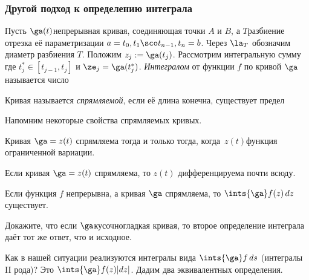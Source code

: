 \documentclass[a4paper]{article}
\begin{document}
\subsubsection{Другой подход к определению интеграла}

\begin{df}
Пусть $\ga(t)$\т непрерывная кривая, соединяющая точки $A$ и $B$, а $T$\т разбиение отрезка её
параметризации $a=t_0, t_1 \sco t_{n-1}, t_n=b$. Через $\la_T$ обозначим диаметр разбиения $T$.
Положим $z_j := \ga(t_j)$. Рассмотрим интегральную сумму
где $t^*_j\in [t_{j-1}, t_j]$ и $\ze_j = \ga(t^*_j)$. \emph{Интегралом} от функции $f$ по кривой $\ga$ называется число
\end{df}

\begin{df}
Кривая называется \emph{спрямляемой}, если её длина конечна,  существует предел
\end{df}

Напомним некоторые свойства спрямляемых кривых.
\begin{theorem}
Кривая $\ga = z(t)$ спрямляема тогда и только тогда, когда~$z(t)$\т функция ограниченной вариации.
\end{theorem}

\begin{theorem}
Если кривая $\ga=z(t)$ спрямляема, то $z(t)$ дифференцируема почти всюду.
\end{theorem}

\begin{stm}
Если функция $f$ непрерывна, а кривая $\ga$ спрямляема, то $\ints{\ga}f(z)\,dz$ существует.
\end{stm}

\begin{problem}
Докажите, что если $\ga$\т кусочно\д гладкая кривая, то второе определение интеграла даёт тот же ответ, что и исходное.
\end{problem}

Как в нашей ситуации реализуются интегралы вида $\ints{\ga}f\,ds$ (интегралы  II рода)? Это
$\ints{\ga}f(z)|dz|$. Дадим два эквивалентных определения.

\begin{df}
\end{df}
\end{document}
